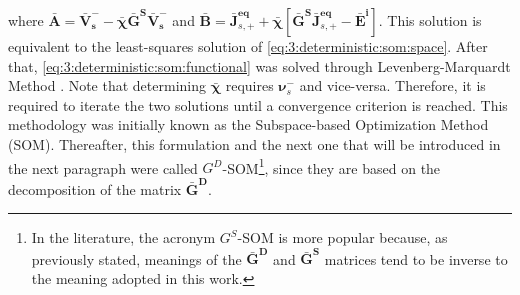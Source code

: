 			\noindent where $\mathbf{\bar{A}} = \mathbf{\bar{V}^-_s}-\boldsymbol{\bar{\chi}}\mathbf{\bar{G}^S}\mathbf{\bar{V}^-_s}$ and $\mathbf{\bar{B}} = \mathbf{\bar{J}}^{\mathbf{eq}}_{s,+} + \boldsymbol{\bar{\chi}}\left[\mathbf{\bar{G}^S}\mathbf{\bar{J}}^\mathbf{eq}_{s,+}-\mathbf{\bar{E}^i}\right]$. This solution is equivalent to the least-squares solution of \eqref{eq:3:deterministic:som:space}. After that, \eqref{eq:3:deterministic:som:functional} was solved through Levenberg-Marquardt Method \citep{franchois1997microwave}. Note that determining $\boldsymbol{\bar{\chi}}$ requires $\boldsymbol{\nu}^-_s$ and vice-versa. Therefore, it is required to iterate the two solutions until a convergence criterion is reached. This methodology was initially known as the Subspace-based Optimization Method (SOM). Thereafter, this formulation and the next one that will be introduced in the next paragraph were called $G^D$-SOM\footnote{In the literature, the acronym $G^S$-SOM is more popular because, as previously stated, meanings of the $\mathbf{\bar{G}^D}$ and $\mathbf{\bar{G}^S}$ matrices tend to be inverse to the meaning adopted in this work.}, since they are based on the decomposition of the matrix $\mathbf{\bar{G}^D}$.
		

